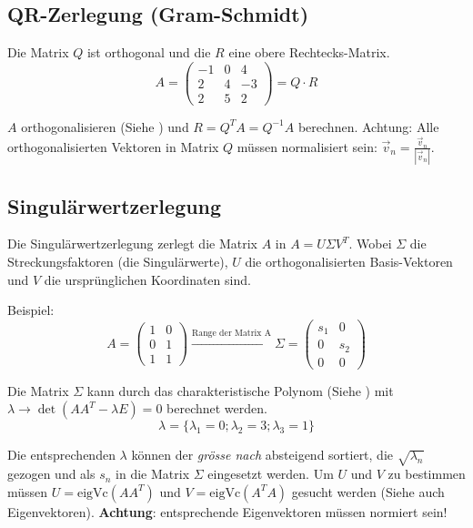 \subsection{QR-Zerlegung (Gram-Schmidt)}
Die Matrix $Q$ ist orthogonal und die $R$ eine obere Rechtecks-Matrix.
\[A = \begin{pmatrix}
	-1 & 0 & 4 \\
	2 & 4 & -3 \\
	2 & 5 & 2
\end{pmatrix} = Q \cdot R \]

\noindent $A$ orthogonalisieren (Siehe ) und $R = Q^{T}A = Q^{-1}A$ berechnen. Achtung: Alle orthogonalisierten Vektoren in Matrix $Q$ müssen normalisiert sein: $\vec{v}_n = \frac{\vec{v}_n}{|\vec{v}_n|}$.


\subsection{Singulärwertzerlegung}
Die Singulärwertzerlegung zerlegt die Matrix $A$ in $A = U\Sigma V^T$. Wobei $\Sigma$ die Streckungsfaktoren (die Singulärwerte), $U$ die orthogonalisierten Basis-Vektoren und $V$ die ursprünglichen Koordinaten sind.

Beispiel:
\[A = \begin{pmatrix}
	1 & 0 \\
	0 & 1 \\
	1 & 1
\end{pmatrix}
\xrightarrow{\text{Range der Matrix A}}
\Sigma = \begin{pmatrix}
	s_1 & 0 \\
	0 & s_2 \\
	0 & 0
\end{pmatrix}
\]

\noindent Die Matrix $\Sigma$ kann durch das charakteristische Polynom (Siehe ) mit $\lambda \rightarrow \det(AA^T - \lambda E) = 0$ berechnet werden. \[\lambda = \{\lambda_1 = 0; \lambda_2 = 3; \lambda_3 = 1\}\]

\noindent Die entsprechenden $\lambda$ können der \textit{grösse nach} absteigend sortiert, die $\sqrt{\lambda_n}$ gezogen und als $s_n$ in die Matrix $\Sigma$ eingesetzt werden. Um $U$ und $V$ zu bestimmen müssen $U = \text{eigVc}(AA^T)$ und $V = \text{eigVc}(A^TA)$ gesucht werden (Siehe auch Eigenvektoren). \textbf{Achtung}: entsprechende Eigenvektoren müssen normiert sein!

